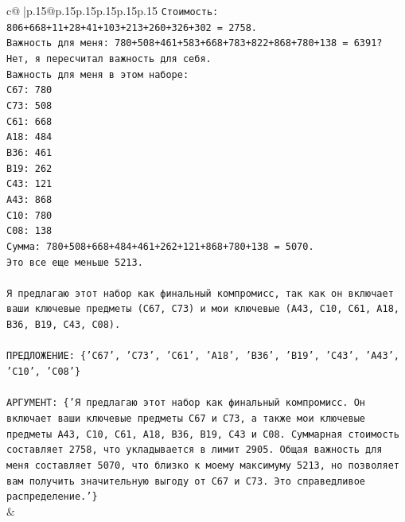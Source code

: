 \documentclass{article}
\begin{document}
{\begin{supertabular}{c@{$\;$}|p{.15\linewidth}@{}p{.15\linewidth}p{.15\linewidth}p{.15\linewidth}p{.15\linewidth}p{.15\linewidth}}
{{{\texttt{Стоимость: 806+668+11+28+41+103+213+260+326+302 = 2758.} \\
\texttt{Важность для меня: 780+508+461+583+668+783+822+868+780+138 = 6391? Нет, я пересчитал важность для себя.} \\
\texttt{Важность для меня в этом наборе:} \\
\texttt{C67: 780} \\
\texttt{C73: 508} \\
\texttt{C61: 668} \\
\texttt{A18: 484} \\
\texttt{B36: 461} \\
\texttt{B19: 262} \\
\texttt{C43: 121} \\
\texttt{A43: 868} \\
\texttt{C10: 780} \\
\texttt{C08: 138} \\
\texttt{Сумма: 780+508+668+484+461+262+121+868+780+138 = 5070.} \\
\texttt{Это все еще меньше 5213.} \\
\\ 
\texttt{Я предлагаю этот набор как финальный компромисс, так как он включает ваши ключевые предметы (C67, C73) и мои ключевые (A43, C10, C61, A18, B36, B19, C43, C08).} \\
\\ 
\texttt{ПРЕДЛОЖЕНИЕ: \{'C67', 'C73', 'C61', 'A18', 'B36', 'B19', 'C43', 'A43', 'C10', 'C08'\}} \\
\\ 
\texttt{АРГУМЕНТ: \{'Я предлагаю этот набор как финальный компромисс. Он включает ваши ключевые предметы C67 и C73, а также мои ключевые предметы A43, C10, C61, A18, B36, B19, C43 и C08. Суммарная стоимость составляет 2758, что укладывается в лимит 2905. Общая важность для меня составляет 5070, что близко к моему максимуму 5213, но позволяет вам получить значительную выгоду от C67 и C73. Это справедливое распределение.'\}} \\
            }
        }
    }
    & \\ \\


\end{supertabular}}
\end{document}
